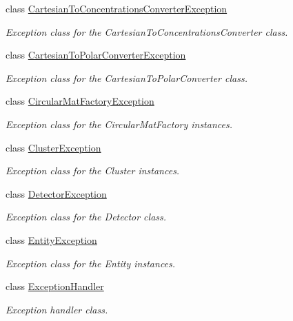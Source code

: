 \begin{DoxyCompactItemize}
\item 
class \hyperlink{classmultiscale_1_1CartesianToConcentrationsConverterException}{Cartesian\-To\-Concentrations\-Converter\-Exception}
\begin{DoxyCompactList}\small\item\em Exception class for the Cartesian\-To\-Concentrations\-Converter class. \end{DoxyCompactList}\item 
class \hyperlink{classmultiscale_1_1CartesianToPolarConverterException}{Cartesian\-To\-Polar\-Converter\-Exception}
\begin{DoxyCompactList}\small\item\em Exception class for the Cartesian\-To\-Polar\-Converter class. \end{DoxyCompactList}\item 
class \hyperlink{classmultiscale_1_1CircularMatFactoryException}{Circular\-Mat\-Factory\-Exception}
\begin{DoxyCompactList}\small\item\em Exception class for the Circular\-Mat\-Factory instances. \end{DoxyCompactList}\item 
class \hyperlink{classmultiscale_1_1ClusterException}{Cluster\-Exception}
\begin{DoxyCompactList}\small\item\em Exception class for the Cluster instances. \end{DoxyCompactList}\item 
class \hyperlink{classmultiscale_1_1DetectorException}{Detector\-Exception}
\begin{DoxyCompactList}\small\item\em Exception class for the Detector class. \end{DoxyCompactList}\item 
class \hyperlink{classmultiscale_1_1EntityException}{Entity\-Exception}
\begin{DoxyCompactList}\small\item\em Exception class for the Entity instances. \end{DoxyCompactList}\item 
class \hyperlink{classmultiscale_1_1ExceptionHandler}{Exception\-Handler}
\begin{DoxyCompactList}\small\item\em Exception handler class. \end{DoxyCompactList}\item 

\end{DoxyCompactItemize}
